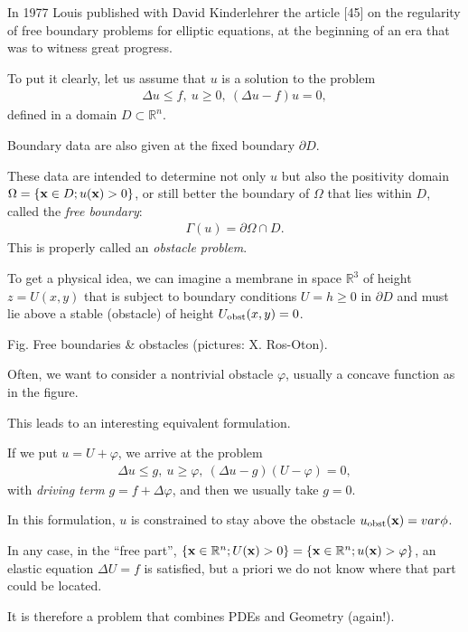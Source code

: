 \documentclass{article}
\begin{document}
In 1977 Louis published with David Kinderlehrer the article [45] on the regularity of free boundary problems for elliptic equations, at the beginning of an era that was to witness great progress.

To put it clearly, let us assume that $u$ is a solution to the problem
\begin{align*}
	\Delta u\le f,\ u\ge 0,\ (\Delta u - f)u = 0,
\end{align*}
defined in a domain $D\subset\mathbb{R}^n$.

Boundary data are also given at the fixed boundary $\partial D$.

These data are intended to determine not only $u$ but also the positivity domain $\Omega = \{{\bf x}\in D;u({\bf x}) > 0\}$, or still better the boundary of $\Omega$ that lies within $D$, called the \textit{free boundary}:
\begin{align*}
	\Gamma(u) = \partial\Omega\cap D.
\end{align*}
This is properly called an \textit{obstacle problem}.

To get a physical idea, we can imagine a membrane in space $\mathbb{R}^3$ of height $z = U(x,y)$ that is subject to boundary conditions $U = h\ge 0$ in $\partial D$ and must lie above a stable (obstacle) of height $U_{\rm obst}(x,y) = 0$.

\textsf{Fig. Free boundaries \& obstacles (pictures: X. Ros-Oton).}

%
Often, we want to consider a nontrivial obstacle $\varphi$, usually a concave function as in the figure.

This leads to an interesting equivalent formulation.

If we put $u = U + \varphi$, we arrive at the problem
\begin{align*}
	\Delta u\le g,\ u\ge\varphi,\ (\Delta u - g)(U - \varphi) = 0,
\end{align*}
with \textit{driving term} $g = f + \Delta\varphi$, and then we usually take $g = 0$.

In this formulation, $u$ is constrained to stay above the obstacle $u_{\rm obst}({\bf x}) = var\phi$.

%
In any case, in the ``free part'', $\{{\bf x}\in\mathbb{R}^n;U({\bf x}) > 0\} = \{{\bf x}\in\mathbb{R}^n;u({\bf x}) > \varphi\}$, an elastic equation $\Delta U = f$ is satisfied, but a priori we do not know where that part could be located.

It is therefore a problem that combines PDEs and Geometry (again!).
\end{document}
